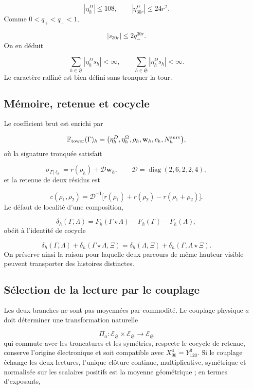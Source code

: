 \[
 |\eta_h^D|\le108,\qquad
 |\eta_{30r}^{\Omega}|\le24r^2.
\]
Comme \(0<q_+<q_-<1\),

\[
 |s_{30r}|\le2q_-^{30r}.
\]
On en déduit

\[
 \sum_{h\in\mathfrak S}|\eta_h^D s_h|<\infty,
 \qquad
 \sum_{h\in\mathfrak S}|\eta_h^\Omega s_h|<\infty.
\]
Le caractère raffiné est bien défini sans tronquer la tour.

\subsection{Mémoire, retenue et cocycle}
Le coefficient brut est enrichi par

\[
 \mathbb F_{\rm tower}(\Gamma)_h
 =\bigl(\eta_h^D,\eta_h^\Omega,\rho_h,
 \mathbf w_h,c_h,N_h^{\rm surv}\bigr),
\]
où la signature tronquée satisfait

\[
 \sigma_{\Gamma|\ell_h}
 =r(\rho_h)+\mathcal D\mathbf w_h,
 \qquad
 \mathcal D=\operatorname{diag}(2,6,2,2,4),
\]
et la retenue de deux résidus est

\[
 c(\rho_1,\rho_2)=
 \mathcal D^{-1}
 \bigl[r(\rho_1)+r(\rho_2)-r(\rho_1+\rho_2)\bigr].
\]
Le défaut de localité d'une composition,

\[
 \delta_h(\Gamma,\Lambda)=
 F_h(\Gamma\star\Lambda)-F_h(\Gamma)-F_h(\Lambda),
\]
obéit à l'identité de cocycle

\[
 \delta_h(\Gamma,\Lambda)
 +\delta_h(\Gamma\star\Lambda,\Xi)
 =\delta_h(\Lambda,\Xi)
 +\delta_h(\Gamma,\Lambda\star\Xi).
\]
On préserve ainsi la raison pour laquelle deux parcours de même hauteur visible peuvent transporter des histoires distinctes.

\subsection{Sélection de la lecture par le couplage}
Les deux branches ne sont pas moyennées par commodité. Le couplage physique \(a\) doit déterminer une transformation naturelle

\[
 \Pi_a:
 \mathcal E_{\mathfrak S}\times\mathcal E_{\mathfrak S}
 \longrightarrow\mathcal E_{\mathfrak S}
\]
qui commute avec les troncatures et les symétries, respecte le cocycle de retenue, conserve l'origine électronique et soit compatible avec \(X_{90}^{4}=Y_{120}^{3}\). Si le couplage échange les deux lectures, l'unique clôture continue, multiplicative, symétrique et normalisée sur les scalaires positifs est la moyenne géométrique ; en termes d'exposants,

